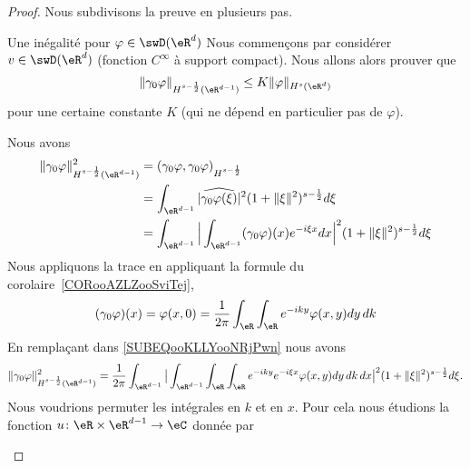 \begin{proof}
    Nous subdivisons la preuve en plusieurs pas.
    \begin{subproof}
        \item[Une inégalité pour \( \varphi\in\swD(\eR^d)\)]
            Nous commençons par considérer \( v\in \swD(\eR^d)\) (fonction \(  C^{\infty}\) à support compact). Nous allons alors prouver que
            \begin{equation}
                \| \gamma_0\varphi \|_{H^{s-\frac{ 1 }{2}}(\eR^{d-1})}\leq K\| \varphi \|_{H^s(\eR^d)}
            \end{equation}
            pour une certaine constante \( K\) (qui ne dépend en particulier pas de \( \varphi\)).

            Nous avons
            \begin{subequations}
                \begin{align}
                    \| \gamma_0\varphi \|^2_{H^{s-\frac{ 1 }{2}}(\eR^{d-1})}&=(  \gamma_0\varphi,\gamma_0\varphi  )_{H^{s-\frac{ 1 }{2}}}\\
                    &=\int_{\eR^{d-1}}| \widehat{\gamma_0\varphi(\xi)} |^2(1+\| \xi \|^2)^{s-\frac{ 1 }{2}}d\xi\\
                    &=\int_{\eR^{d-1}}\Big| \int_{\eR^{d-1}}(\gamma_0\varphi)(x) e^{-i\xi x}dx \Big|^2(1+\| \xi \|^2)^{s-\frac{ 1 }{2}}d\xi \label{SUBEQooKLLYooNRjPwn} \\
                \end{align}
            \end{subequations}
            Nous appliquons la trace en appliquant la formule du corolaire~\ref{CORooAZLZooSviTej},
            \begin{equation}
                (\gamma_0\varphi)(x)= \varphi(x,0) =\frac{1}{ 2\pi }\int_{\eR}\int_{\eR} e^{-iky}\varphi(x,y)dy\,dk
            \end{equation}
            En remplaçant dans \eqref{SUBEQooKLLYooNRjPwn} nous avons
            \begin{equation}
                \| \gamma_0\varphi \|^2_{H^{s-\frac{ 1 }{2}}(\eR^{d-1})}=\frac{1}{ 2\pi }\int_{\eR^{d-1}}\big| \int_{\eR^{d-1}}\int_{\eR}\int_{\eR} e^{-iky} e^{-i\xi x}\varphi(x,y)dy\,dk\,dx \big|^2(1+\| \xi \|^2)^{s-\frac{ 1 }{2}}d\xi.
            \end{equation}
            Nous voudrions permuter les intégrales en \( k\) et en \( x\). Pour cela nous étudions la fonction \( u\colon \eR\times \eR^{d-1}\to \eC\) donnée par
            \begin{equation}

\end{equation}
\end{subproof}
\end{proof}
